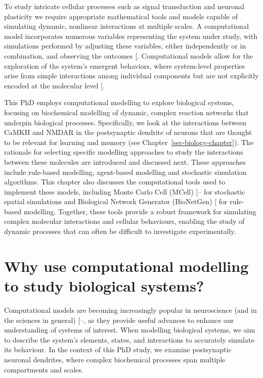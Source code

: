 \documentclass[
  11pt,
  letterpaper,
]{scrreprt}
\begin{document}
To study intricate cellular processes such as signal transduction and
neuronal plasticity we require appropriate mathematical tools and models
capable of simulating dynamic, nonlinear interactions at multiple
scales. A computational model incorporates numerous variables
representing the system under study, with simulations performed by
adjusting these variables, either independently or in combination, and
observing the outcomes {[}\citeproc{ref-hassan2023Perspectives}{239}{]}.
Computational models allow for the exploration of the system's emergent
behaviors, where system-level properties arise from simple interactions
among individual components but are not explicitly encoded at the
molecular level {[}\citeproc{ref-xiao2015Emergent}{240}{]}.

This PhD employs computational modelling to explore biological systems,
focusing on biochemical modelling of dynamic, complex reaction networks
that underpin biological processes. Specifically, we look at the
interactions between CaMKII and NMDAR in the postsynaptic dendrite of
neurons that are thought to be relevant for learning and memory (see
Chapter~\ref{sec-biology-chapter}). The rationale for selecting specific
modelling approaches to study the interactions between these molecules
are introduced and discussed next. These approaches include rule-based
modelling, agent-based modelling and stochastic simulation algorithms.
This chapter also discusses the computational tools used to implement
these models, including Monte Carlo Cell (MCell)
{[}--\citeproc{ref-husar2022MCell4}{244}{]}
for stochastic spatial simulations and Biological Network Generator
(BioNetGen) {[}\citeproc{ref-harris2016BioNetGena}{245}{]} for
rule-based modelling. Together, these tools provide a robust framework
for simulating complex molecular interactions and cellular behaviours,
enabling the study of dynamic processes that can often be difficult to
investigate experimentally.

\section{Why use computational modelling to study biological
systems?}\label{why-use-computational-modelling-to-study-biological-systems}

Computational models are becoming increasingly popular in neuroscience
(and in the sciences in general)
{[}--\citeproc{ref-levenstein2023Role}{248}{]},
as they provide useful advances to enhance our understanding of systems
of interest. When modelling biological systems, we aim to describe the
system's elements, states, and interactions to accurately simulate its
behaviour. In the context of this PhD study, we examine postsynaptic
neuronal dendrites, where complex biochemical processes span multiple
compartments and scales.
\end{document}
